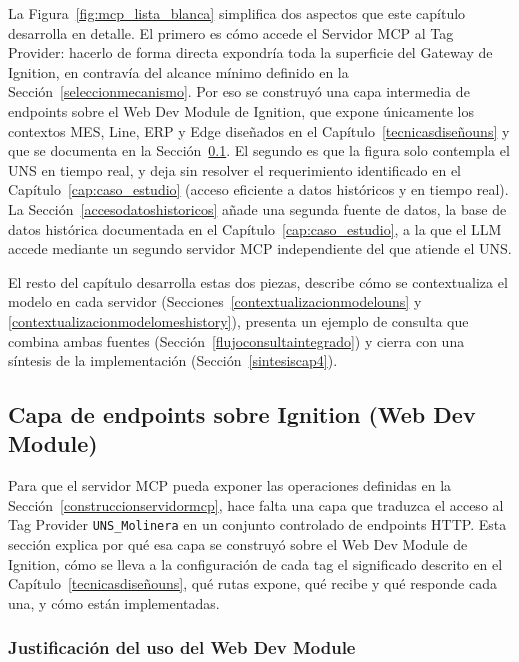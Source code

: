 La Figura~\ref{fig:mcp_lista_blanca} simplifica dos aspectos que este capítulo desarrolla en detalle. El primero es cómo accede el Servidor MCP al Tag Provider: hacerlo de forma directa expondría toda la superficie del Gateway de Ignition, en contravía del alcance mínimo definido en la Sección~\ref{seleccionmecanismo}. Por eso se construyó una capa intermedia de endpoints sobre el Web Dev Module de Ignition, que expone únicamente los contextos MES, Line, ERP y Edge diseñados en el Capítulo~\ref{tecnicasdiseñouns} y que se documenta en la Sección~\ref{capaendpoints}. El segundo es que la figura solo contempla el UNS en tiempo real, y deja sin resolver el requerimiento  identificado en el Capítulo~\ref{cap:caso_estudio}
(acceso eficiente a datos históricos y en tiempo real). La Sección~\ref{accesodatoshistoricos} añade una segunda fuente de datos, la base de datos histórica documentada en el Capítulo~\ref{cap:caso_estudio}, a la que el LLM accede mediante un segundo servidor MCP independiente del que atiende el UNS.

El resto del capítulo desarrolla estas dos piezas, describe cómo se contextualiza el modelo en cada servidor (Secciones~\ref{contextualizacionmodelouns} y
\ref{contextualizacionmodelomeshistory}), presenta un ejemplo de consulta que combina ambas fuentes (Sección~\ref{flujoconsultaintegrado}) y cierra con una síntesis de la implementación (Sección~\ref{sintesiscap4}).

\subsection{Capa de endpoints sobre Ignition (Web Dev Module)}
\label{capaendpoints}

Para que el servidor MCP pueda exponer las operaciones definidas en la Sección~\ref{construccionservidormcp}, hace falta una capa que traduzca el acceso al Tag Provider \texttt{UNS\_Molinera} en un conjunto controlado de endpoints HTTP. Esta sección explica por qué esa capa se construyó sobre el Web Dev Module de Ignition, cómo se lleva a la configuración de cada tag el significado descrito en el Capítulo~\ref{tecnicasdiseñouns}, qué rutas expone, qué recibe y qué responde cada una, y cómo están implementadas.

\subsubsection{Justificación del uso del Web Dev Module}
\label{justificacionwebdev}

